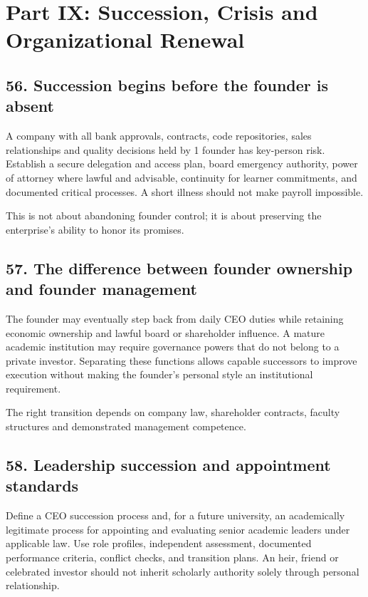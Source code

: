 \section*{Part IX: Succession, Crisis and Organizational Renewal}

\subsection{56. Succession begins before the founder is absent}

A company with all bank approvals, contracts, code repositories, sales relationships and quality decisions held by 1 founder has key-person risk. Establish a secure delegation and access plan, board emergency authority, power of attorney where lawful and advisable, continuity for learner commitments, and documented critical processes. A short illness should not make payroll impossible.

This is not about abandoning founder control; it is about preserving the enterprise's ability to honor its promises.

\subsection{57. The difference between founder ownership and founder management}

The founder may eventually step back from daily CEO duties while retaining economic ownership and lawful board or shareholder influence. A mature academic institution may require governance powers that do not belong to a private investor. Separating these functions allows capable successors to improve execution without making the founder's personal style an institutional requirement.

The right transition depends on company law, shareholder contracts, faculty structures and demonstrated management competence.

\subsection{58. Leadership succession and appointment standards}

Define a CEO succession process and, for a future university, an academically legitimate process for appointing and evaluating senior academic leaders under applicable law. Use role profiles, independent assessment, documented performance criteria, conflict checks, and transition plans. An heir, friend or celebrated investor should not inherit scholarly authority solely through personal relationship.

